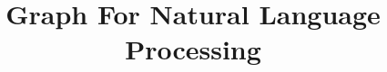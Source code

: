 \documentclass[xcolor=dvipsnames,compress,t,pdf,9pt]{beamer}
\title[\insertframenumber /\inserttotalframenumber]{Graph For Natural Language Processing}
\begin{document}
	\begin{frame}
	\titlepage
	\end{frame}
	
	
\end{document}
